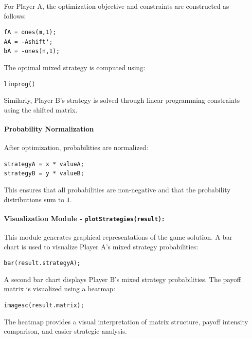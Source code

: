 \documentclass[12pt,a4paper]{article}
\begin{document}
For Player A, the optimization objective and constraints are constructed as follows:

\begin{lstlisting}[style=code]
fA = ones(m,1);
AA = -Ashift';
bA = -ones(n,1);
\end{lstlisting}

The optimal mixed strategy is computed using:

\begin{lstlisting}[style=code]
linprog()
\end{lstlisting}

Similarly, Player B's strategy is solved through linear programming constraints using the shifted matrix.

\paragraph{Probability Normalization}

After optimization, probabilities are normalized:

\begin{lstlisting}[style=code]
strategyA = x * valueA;
strategyB = y * valueB;
\end{lstlisting}

This ensures that all probabilities are non-negative and that the probability distributions sum to \(1\).

\paragraph{Visualization Module - \texttt{plotStrategies(result):}}

This module generates graphical representations of the game solution. A bar chart is used to visualize Player A's mixed strategy probabilities:

\begin{lstlisting}[style=code]
bar(result.strategyA);
\end{lstlisting}

A second bar chart displays Player B's mixed strategy probabilities. The payoff matrix is visualized using a heatmap:

\begin{lstlisting}[style=code]
imagesc(result.matrix);
\end{lstlisting}

The heatmap provides a visual interpretation of matrix structure, payoff intensity comparison, and easier strategic analysis.
\end{document}
